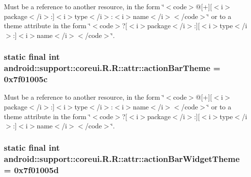 Must be a reference to another resource, in the form \char`\"{}$<$code$>$@\mbox{[}+\mbox{]}\mbox{[}$<$i$>$package$<$/i$>$:\mbox{]}$<$i$>$type$<$/i$>$:$<$i$>$name$<$/i$>$$<$/code$>$\char`\"{} or to a theme attribute in the form \char`\"{}$<$code$>$?\mbox{[}$<$i$>$package$<$/i$>$:\mbox{]}\mbox{[}$<$i$>$type$<$/i$>$:\mbox{]}$<$i$>$name$<$/i$>$$<$/code$>$\char`\"{}. \hypertarget{classandroid_1_1support_1_1coreui_1_1_r_1_1attr_01820def2a2aa3a7b3a98d5f95240b04}{
\subsubsection[{actionBarTheme}]{\setlength{\rightskip}{0pt plus 5cm}static final int android::support::coreui.R.R::attr::actionBarTheme = 0x7f01005c}}
\label{classandroid_1_1support_1_1coreui_1_1_r_1_1attr_01820def2a2aa3a7b3a98d5f95240b04}


Must be a reference to another resource, in the form \char`\"{}$<$code$>$@\mbox{[}+\mbox{]}\mbox{[}$<$i$>$package$<$/i$>$:\mbox{]}$<$i$>$type$<$/i$>$:$<$i$>$name$<$/i$>$$<$/code$>$\char`\"{} or to a theme attribute in the form \char`\"{}$<$code$>$?\mbox{[}$<$i$>$package$<$/i$>$:\mbox{]}\mbox{[}$<$i$>$type$<$/i$>$:\mbox{]}$<$i$>$name$<$/i$>$$<$/code$>$\char`\"{}. \hypertarget{classandroid_1_1support_1_1coreui_1_1_r_1_1attr_596d8939347e81d9884d889ce3f793b5}{
\subsubsection[{actionBarWidgetTheme}]{\setlength{\rightskip}{0pt plus 5cm}static final int android::support::coreui.R.R::attr::actionBarWidgetTheme = 0x7f01005d}}
\label{classandroid_1_1support_1_1coreui_1_1_r_1_1attr_596d8939347e81d9884d889ce3f793b5}


